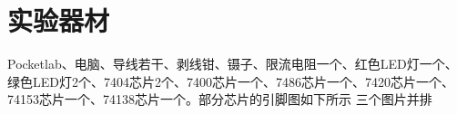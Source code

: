 \documentclass{ctexart}
\begin{document}
\section{实验器材}
Pocketlab、电脑、导线若干、剥线钳、镊子、限流电阻一个、红色LED灯一个、绿色LED灯2个、7404芯片2个、7400芯片一个、7486芯片一个、7420芯片一个、74153芯片一个、74138芯片一个。部分芯片的引脚图如下所示
三个图片并排
\end{document}

